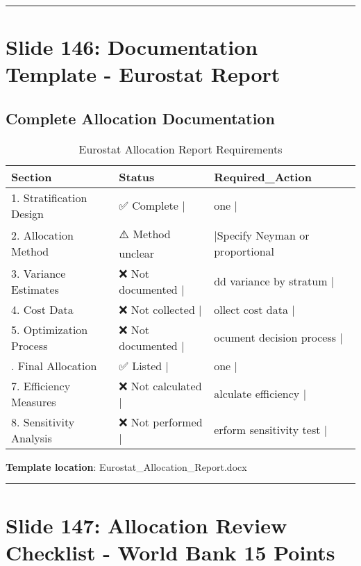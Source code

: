 \documentclass[
]{article}
\begin{document}
\begin{center}\rule{0.5\linewidth}{0.5pt}\end{center}

\section{Slide 146: Documentation Template - Eurostat
Report}\label{slide-146-documentation-template---eurostat-report}

\subsection{Complete Allocation
Documentation}\label{complete-allocation-documentation}

\begin{longtable}[t]{lll}
\caption{\label{tab:documentation-alloc}Eurostat Allocation Report Requirements}\\
\toprule
Section & Status & Required\_Action\\
\midrule
1. Stratification Design & ✅ Complete       | & one                           |\\
2. Allocation Method & ⚠️ Method unclear & |Specify Neyman or proportional\\
3. Variance Estimates & ❌ Not documented | & dd variance by stratum        |\\
4. Cost Data & ❌ Not collected  | & ollect cost data              |\\
5. Optimization Process & ❌ Not documented | & ocument decision process      |\\
\addlinespace
6. Final Allocation & ✅ Listed         | & one                           |\\
7. Efficiency Measures & ❌ Not calculated | & alculate efficiency           |\\
8. Sensitivity Analysis & ❌ Not performed  | & erform sensitivity test       |\\
\bottomrule
\end{longtable}

\textbf{Template location}: Eurostat\_Allocation\_Report.docx

\begin{center}\rule{0.5\linewidth}{0.5pt}\end{center}

\section{Slide 147: Allocation Review Checklist - World Bank 15
Points}\label{slide-147-allocation-review-checklist---world-bank-15-points}
\end{document}
